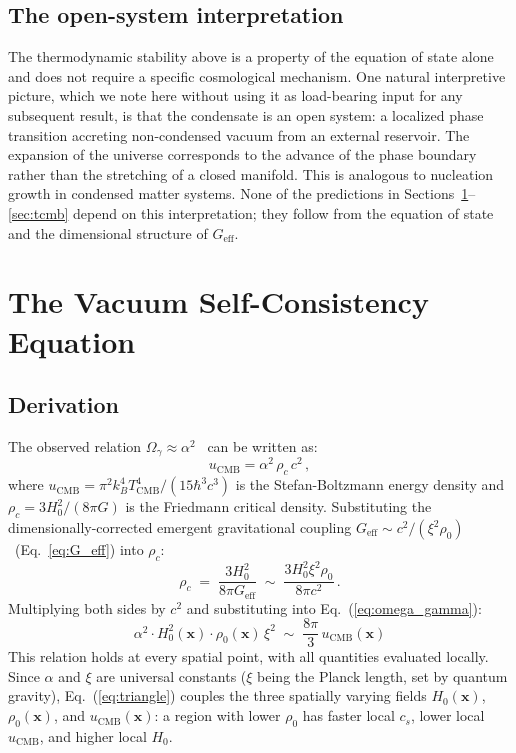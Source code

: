 \documentclass[12pt, a4paper]{article}
\newcommand{\Geff}{G_{\mathrm{eff}}}
\newcommand{\Tcmb}{T_{\mathrm{CMB}}}
\begin{document}
\subsection{The open-system interpretation}
\label{sec:open-system}
The thermodynamic stability above is a property of the equation of state alone and does not require a specific cosmological mechanism. One natural interpretive picture, which we note here without using it as load-bearing input for any subsequent result, is that the condensate is an open system: a localized phase transition accreting non-condensed vacuum from an external reservoir. The expansion of the universe corresponds to the advance of the phase boundary rather than the stretching of a closed manifold. This is analogous to nucleation growth in condensed matter systems. None of the predictions in Sections~\ref{sec:self_consistency}--\ref{sec:tcmb} depend on this interpretation; they follow from the equation of state and the dimensional structure of $\Geff$.


\newpage
\section{The Vacuum Self-Consistency Equation}
\label{sec:self_consistency}

\subsection{Derivation}

The observed relation $\Omega_\gamma \approx \alpha^2$~\cite{kulangiev_2026o} can be written as:
\begin{equation}
    u_{\mathrm{CMB}} = \alpha^2\,\rho_c\,c^2\,,
\label{eq:omega_gamma}
\end{equation}
where $u_{\mathrm{CMB}} = \pi^2 k_B^4 \Tcmb^4/(15\hbar^3 c^3)$ is the Stefan-Boltzmann energy density and $\rho_c = 3H_0^2/(8\pi G)$ is the Friedmann critical density. Substituting the dimensionally-corrected emergent gravitational coupling $\Geff \sim c^2/(\xi^2\rho_0)$~(Eq.~\ref{eq:G_eff}) into $\rho_c$:
\begin{equation}
    \rho_c \;=\; \frac{3H_0^2}{8\pi G_{\mathrm{eff}}}
           \;\sim\; \frac{3 H_0^2 \xi^2\rho_0}{8\pi c^2}\,.
\label{eq:rho_c_condensate}
\end{equation}
Multiplying both sides by $c^2$ and substituting into Eq.~(\ref{eq:omega_gamma}):
\begin{equation}
    \boxed{\;\alpha^2 \cdot H_0^2(\mathbf{x}) \cdot \rho_0(\mathbf{x})\,\xi^2
    \;\sim\; \frac{8\pi}{3}\, u_{\mathrm{CMB}}(\mathbf{x})\;}
\label{eq:triangle}
\end{equation}
This relation holds at every spatial point, with all quantities evaluated locally. Since $\alpha$ and $\xi$ are universal constants ($\xi$ being the Planck length, set by quantum gravity), Eq.~(\ref{eq:triangle}) couples the three spatially varying fields $H_0(\mathbf{x})$, $\rho_0(\mathbf{x})$, and $u_{\mathrm{CMB}}(\mathbf{x})$: a region with lower $\rho_0$ has faster local $c_s$, lower local $u_{\mathrm{CMB}}$, and higher local $H_0$.
\end{document}
